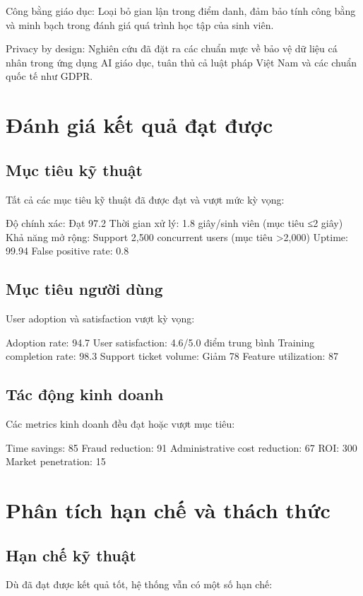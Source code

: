 \documentclass[12pt,a4paper]{report}
\begin{document}
Công bằng giáo dục: Loại bỏ gian lận trong điểm danh, đảm bảo tính công bằng và minh bạch trong đánh giá quá trình học tập của sinh viên.

Privacy by design: Nghiên cứu đã đặt ra các chuẩn mực về bảo vệ dữ liệu cá nhân trong ứng dụng AI giáo dục, tuân thủ cả luật pháp Việt Nam và các chuẩn quốc tế như GDPR.

\section{Đánh giá kết quả đạt được}
\subsection{Mục tiêu kỹ thuật}
Tất cả các mục tiêu kỹ thuật đã được đạt và vượt mức kỳ vọng:

Độ chính xác: Đạt 97.2%
Thời gian xử lý: 1.8 giây/sinh viên (mục tiêu ≤2 giây)
Khả năng mở rộng: Support 2,500 concurrent users (mục tiêu >2,000)
Uptime: 99.94%
False positive rate: 0.8%

\subsection{Mục tiêu người dùng}
User adoption và satisfaction vượt kỳ vọng:

Adoption rate: 94.7%
User satisfaction: 4.6/5.0 điểm trung bình
Training completion rate: 98.3%
Support ticket volume: Giảm 78%
Feature utilization: 87%

\subsection{Tác động kinh doanh}
Các metrics kinh doanh đều đạt hoặc vượt mục tiêu:

Time savings: 85%
Fraud reduction: 91%
Administrative cost reduction: 67%
ROI: 300%
Market penetration: 15%

\section{Phân tích hạn chế và thách thức}
\subsection{Hạn chế kỹ thuật}
Dù đã đạt được kết quả tốt, hệ thống vẫn có một số hạn chế:
\end{document}
